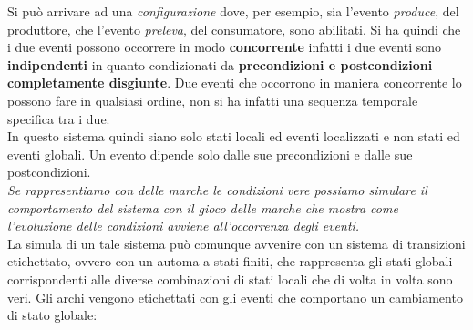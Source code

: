 \documentclass[a4paper,12pt, oneside]{book}
\begin{document}
\begin{esempio}
\begin{center}
  \end{center}
  Si può arrivare ad una \textit{configurazione} dove, per esempio, sia l'evento
  \textit{produce}, del produttore, che l'evento \textit{preleva}, del
  consumatore, sono abilitati. Si ha quindi che i due eventi possono occorrere
  in modo \textbf{concorrente} infatti i due eventi sono \textbf{indipendenti}
  in quanto condizionati da \textbf{precondizioni e postcondizioni completamente
    disgiunte}. Due eventi che occorrono in maniera concorrente lo possono fare in
  qualsiasi ordine, non si ha infatti una sequenza temporale specifica tra i
  due. \\
  In questo sistema quindi siano solo stati locali ed eventi localizzati e non
  stati ed eventi globali. Un evento dipende solo dalle sue precondizioni e
  dalle sue postcondizioni.\\
  \textit{Se rappresentiamo con delle marche le condizioni vere possiamo
    simulare il comportamento del sistema con il \textit{gioco delle marche} che
    mostra come l'evoluzione delle condizioni avviene all'occorrenza degli
    eventi.} \\
  La simula di un tale sistema può comunque avvenire con un sistema di
  transizioni etichettato, ovvero con un automa a stati finiti, che rappresenta
  gli stati globali corrispondenti alle diverse combinazioni di stati locali che
  di volta in volta sono veri.
  \newpage
  Gli archi vengono etichettati con gli eventi che
  comportano un cambiamento di stato globale:
 \begin{center}
\end{center}
\end{esempio}
\end{document}
